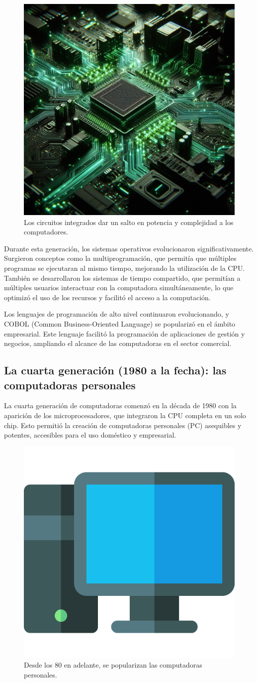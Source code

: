 \begin{figure}[H]
	\centering
	\includegraphics[width=0.4\linewidth]{Imagenes/buses.jpeg}
	\caption{Los circuitos integrados dar un salto en potencia y complejidad a los computadores.}
	\label{fig:enter-label}
\end{figure}

Durante esta generación, los sistemas operativos evolucionaron significativamente. Surgieron conceptos como la multiprogramación, que permitía que múltiples programas se ejecutaran al mismo tiempo, mejorando la utilización de la CPU. También se desarrollaron los sistemas de tiempo compartido, que permitían a múltiples usuarios interactuar con la computadora simultáneamente, lo que optimizó el uso de los recursos y facilitó el acceso a la computación.

Los lenguajes de programación de alto nivel continuaron evolucionando, y COBOL (Common Business-Oriented Language) se popularizó en el ámbito empresarial. Este lenguaje facilitó la programación de aplicaciones de gestión y negocios, ampliando el alcance de las computadoras en el sector comercial.

\subsection{La cuarta generación (1980 a la fecha): las computadoras personales}


La cuarta generación de computadoras comenzó en la década de 1980 con la aparición de los microprocesadores, que integraron la CPU completa en un solo chip. Esto permitió la creación de computadoras personales (PC) asequibles y potentes, accesibles para el uso doméstico y empresarial.
\begin{figure}[H]
	\centering
	\includegraphics[width=0.4\linewidth]{Imagenes/computer.png}
	\caption{Desde los 80 en adelante, se popularizan las computadoras personales.}
	\label{fig:enter-label}
\end{figure}


